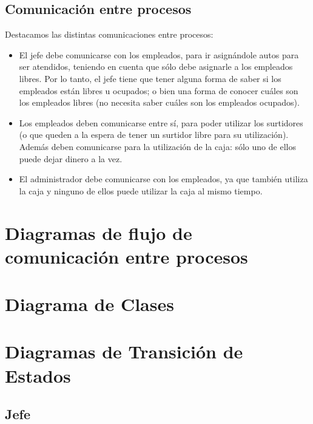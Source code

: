 \documentclass[a4paper,12pt]{article}
\begin{document}
\subsection{Comunicación entre procesos}
Destacamos las distintas comunicaciones entre procesos:
\begin{itemize}
\item El jefe debe comunicarse con los empleados, para ir asignándole autos para ser atendidos, teniendo en cuenta que sólo debe asignarle a los empleados libres. Por lo tanto, el jefe tiene que tener alguna forma de saber si los empleados están libres u ocupados; o bien una forma de conocer cuáles son los empleados libres (no necesita saber cuáles son los empleados ocupados).
\item Los empleados deben comunicarse entre sí, para poder utilizar los surtidores (o que queden a la espera de tener un surtidor libre para su utilización). Además deben comunicarse para la utilización de la caja: sólo uno de ellos puede dejar dinero a la vez.
\item El administrador debe comunicarse con los empleados, ya que también utiliza la caja y ninguno de ellos puede utilizar la caja al mismo tiempo.
\end{itemize}

\section{Diagramas de flujo de comunicación entre procesos}

\section{Diagrama de Clases}

\section{Diagramas de Transición de Estados}
\subsection{Jefe}
\end{document}
